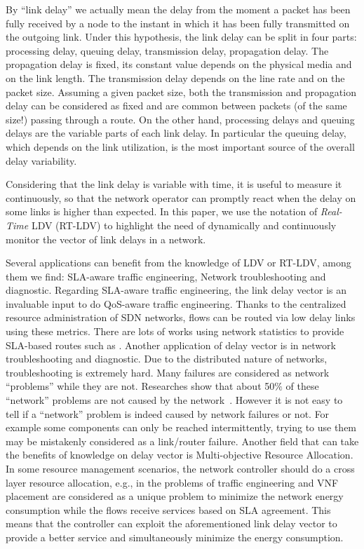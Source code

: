 \documentclass[10pt, journal, letterpaper]{IEEEtran}
\newcommand{\dq}[1]{``#1''}
\begin{document}
By \dq{link delay} we actually mean the delay from the moment a packet has been fully received by a node to the instant in which it has been fully transmitted on the outgoing link. Under this hypothesis, the link delay can be split in four parts: processing delay, queuing delay, transmission delay, propagation delay. The propagation delay is fixed, its constant value depends on the physical media and on the link length. The transmission delay depends on the line rate and on the packet size. Assuming a given packet size, both the transmission and propagation delay can be considered as fixed and are common between packets (of the same size!) passing through a route. On the other hand, processing delays and queuing delays are the variable parts of each link delay. In particular the queuing delay, which depends on the link utilization, is the most important source of the overall delay variability.

Considering that the link delay is variable with time, it is useful to measure it continuously, so that the network operator can promptly react when the delay on some links is higher than expected. In this paper, we use the notation of \textit{Real-Time} LDV (RT-LDV) to highlight the need of dynamically and continuously monitor the vector of link delays in a network.

Several applications can benefit from the knowledge of LDV or RT-LDV, among them we find: SLA-aware traffic engineering, Network troubleshooting and diagnostic. Regarding SLA-aware traffic engineering, the link delay vector is an invaluable input to do QoS-aware traffic engineering. Thanks to the centralized resource administration of SDN networks, flows can be routed via low delay links using these metrics. There are lots of works using network statistics to provide SLA-based routes such as \cite{kamoun2018ip,tajiki2017optimal,lin2018dte}. Another application of delay vector is in network troubleshooting and diagnostic. Due to the distributed nature of networks, troubleshooting is extremely hard. Many failures are considered as network \dq{problems} while they are not. Researches show that about 50$\%$ of these \dq{network} problems are not caused by the network~\cite{guo2015pingmesh}. However it is not easy to tell if a \dq{network} problem is indeed caused by network failures or not. For example some components can only be reached intermittently, trying to use them may be mistakenly considered as a link/router failure. Another field that can take the benefits of knowledge on delay vector is Multi-objective Resource Allocation. In some resource management scenarios, the network controller should do a cross layer resource allocation, e.g., in \cite{tajiki2018energy} the problems of traffic engineering and VNF placement are considered as a unique problem to minimize the network energy consumption while the flows receive services based on SLA agreement. This means that the controller can exploit the aforementioned link delay vector to provide a better service and simultaneously minimize the energy consumption.
\end{document}
